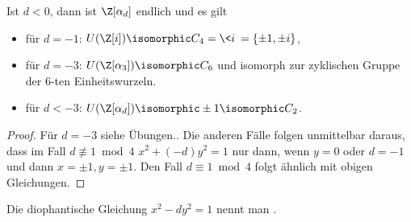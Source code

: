 \begin{st} \label{4.17}
	Ist $d < 0$, dann ist $\Z[\alpha_d]$ endlich und es gilt
	\begin{itemize}
		\item
			für $d = -1$: $U(\Z[i]) \isomorphic C_4 = \<i\> = \{ \pm 1, \pm i \}$,
		\item
			für $d = -3$: $U(\Z[\alpha_3]) \isomorphic C_6$ und isomorph zur zyklischen Gruppe der $6$-ten Einheitswurzeln.
		\item
			für $d < -3$: $U(\Z[\alpha_d]) \isomorphic \pm 1 \isomorphic C_2$.
	\end{itemize}
	\begin{proof}
		Für $d = -3$ siehe Übungen..
		Die anderen Fälle folgen unmittelbar daraus, dass im Fall $d \not\equiv 1 \bmod 4$ $x^2 + (-d) y^2 = 1$ nur dann, wenn $y = 0$ oder $d = -1$ und dann $x = \pm 1, y = \pm 1$.
		Den Fall $d \equiv 1 \bmod 4$ folgt ähnlich mit obigen Gleichungen.
	\end{proof}
\end{st}

\begin{df} \label{4.18}
	Die diophantische Gleichung $x^2 - dy^2 = 1$ nennt man .
\end{df}

